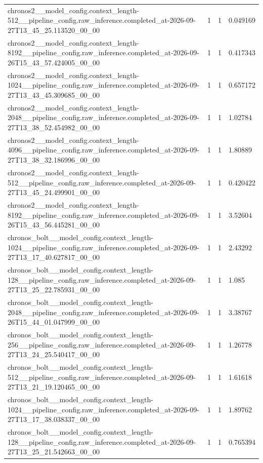 \begin{tabular}{llll}
chronos2\_\_model\_config.context\_length-512\_\_pipeline\_config.raw\_inference.completed\_at-2026-09-27T13\_45\_25.113520\_00\_00 & 1 & 1 & 0.049169 \\
chronos2\_\_model\_config.context\_length-8192\_\_pipeline\_config.raw\_inference.completed\_at-2026-09-26T15\_43\_57.424005\_00\_00 & 1 & 1 & 0.417343 \\
chronos2\_\_model\_config.context\_length-1024\_\_pipeline\_config.raw\_inference.completed\_at-2026-09-27T13\_43\_45.309685\_00\_00 & 1 & 1 & 0.657172 \\
chronos2\_\_model\_config.context\_length-2048\_\_pipeline\_config.raw\_inference.completed\_at-2026-09-27T13\_38\_52.454982\_00\_00 & 1 & 1 & 1.02784 \\
chronos2\_\_model\_config.context\_length-4096\_\_pipeline\_config.raw\_inference.completed\_at-2026-09-27T13\_38\_32.186996\_00\_00 & 1 & 1 & 1.80889 \\
chronos2\_\_model\_config.context\_length-512\_\_pipeline\_config.raw\_inference.completed\_at-2026-09-27T13\_45\_24.499901\_00\_00 & 1 & 1 & 0.420422 \\
chronos2\_\_model\_config.context\_length-8192\_\_pipeline\_config.raw\_inference.completed\_at-2026-09-26T15\_43\_56.445281\_00\_00 & 1 & 1 & 3.52604 \\
chronos\_bolt\_\_model\_config.context\_length-1024\_\_pipeline\_config.raw\_inference.completed\_at-2026-09-27T13\_17\_40.627817\_00\_00 & 1 & 1 & 2.43292 \\
chronos\_bolt\_\_model\_config.context\_length-128\_\_pipeline\_config.raw\_inference.completed\_at-2026-09-27T13\_25\_22.785931\_00\_00 & 1 & 1 & 1.085 \\
chronos\_bolt\_\_model\_config.context\_length-2048\_\_pipeline\_config.raw\_inference.completed\_at-2026-09-26T15\_44\_01.047999\_00\_00 & 1 & 1 & 3.38767 \\
chronos\_bolt\_\_model\_config.context\_length-256\_\_pipeline\_config.raw\_inference.completed\_at-2026-09-27T13\_24\_25.540417\_00\_00 & 1 & 1 & 1.26778 \\
chronos\_bolt\_\_model\_config.context\_length-512\_\_pipeline\_config.raw\_inference.completed\_at-2026-09-27T13\_21\_19.120465\_00\_00 & 1 & 1 & 1.61618 \\
chronos\_bolt\_\_model\_config.context\_length-1024\_\_pipeline\_config.raw\_inference.completed\_at-2026-09-27T13\_17\_38.038337\_00\_00 & 1 & 1 & 1.89762 \\
chronos\_bolt\_\_model\_config.context\_length-128\_\_pipeline\_config.raw\_inference.completed\_at-2026-09-27T13\_25\_21.542663\_00\_00 & 1 & 1 & 0.765394 \\

\end{tabular}
